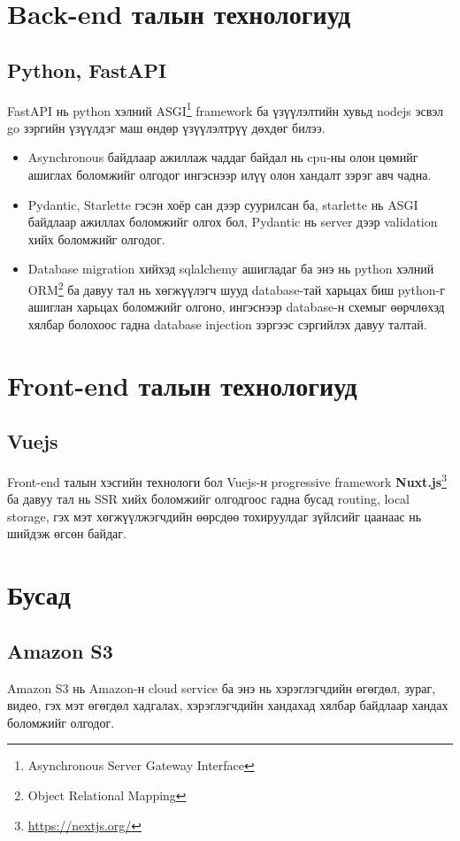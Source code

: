 \section{Back-end талын технологиуд}
\subsection{Python, FastAPI}
FastAPI нь python хэлний ASGI\footnote{Asynchronous Server Gateway Interface}
framework ба үзүүлэлтийн хувьд nodejs эсвэл go зэргийн үзүүлдэг маш өндөр үзүүлэлтрүү дөхдөг билээ.

\begin{itemize}
	\item Asynchronous байдлаар ажиллаж чаддаг байдал нь cpu-ны олон цөмийг ашиглах боломжийг олгодог ингэснээр илүү олон хандалт зэрэг авч чадна.
	\item Pydantic, Starlette гэсэн хоёр сан дээр суурилсан ба, starlette нь ASGI байдлаар ажиллах боломжийг олгох бол, Pydantic нь server дээр validation хийх боломжийг олгодог.
	\item Database migration хийхэд sqlalchemy ашигладаг ба энэ нь python хэлний ORM\footnote{Object Relational Mapping} ба давуу тал нь хөгжүүлэгч шууд database-тай харьцах биш python-г ашиглан харьцах боломжийг олгоно,    ингэснээр database-н схемыг өөрчлөхэд хялбар болохоос гадна database injection зэргээс сэргийлэх давуу талтай.
\end{itemize}


\section{Front-end талын технологиуд}
\subsection{Vuejs}
Front-end талын хэсгийн технологи бол Vuejs-н progressive framework \textbf{Nuxt.js}\footnote{\url{https://nextjs.org/}} ба давуу тал нь SSR хийх боломжийг олгодгоос гадна бусад routing, local storage, гэх мэт хөгжүүлжэгчдийн өөрсдөө тохируулдаг зүйлсийг цаанаас нь шийдэж өгсөн байдаг.

\section{Бусад}
\subsection{Amazon S3}
Amazon S3 нь Amazon-н cloud service ба энэ нь хэрэглэгчдийн өгөгдөл, зураг, видео, гэх мэт өгөгдөл хадгалах, хэрэглэгчдийн хандахад хялбар байдлаар хандах боломжийг олгодог.
